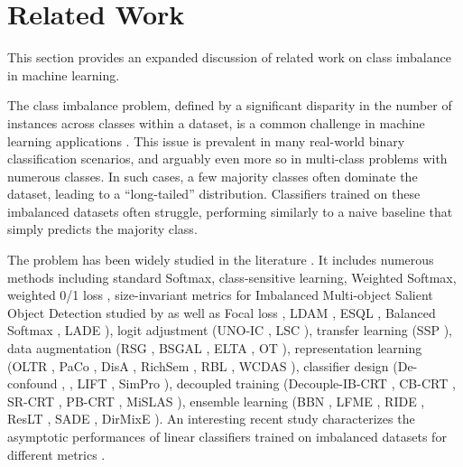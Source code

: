 \section{Related Work}
\label{app:related-work}

This section provides an expanded discussion of related work on class
imbalance in machine learning.

The class imbalance problem, defined by a significant disparity in the
number of instances across classes within a dataset, is a common
challenge in machine learning applications
\citep{Lewis:1994,Fawcett:1996,KubatMatwin1997,kang2021exploring,
  menon2020long, liu2019large,cui2019class}.  This issue is prevalent
in many real-world binary classification scenarios, and arguably even
more so in multi-class problems with numerous classes. In such cases,
a few majority classes often dominate the dataset, leading to a
``long-tailed'' distribution.  Classifiers trained on these imbalanced
datasets often struggle, performing similarly to a naive baseline that
simply predicts the majority class.

The problem has been widely studied in the literature
\citep{CardieNowe1997,KubatMatwin1997,chawla2002smote,he2009learning,
  WallaceSmallBrodleyTrikalinos2011}. It includes numerous methods
including standard Softmax, class-sensitive learning, {Weighted
  Softmax}, weighted 0/1 loss
\citep{GabidollaZharmagambetovCarreiraPerpinan2024}, size-invariant
metrics for Imbalanced Multi-object Salient Object Detection studied
by \citet{LiXuBaoYangCongCaoHuang2024} as well as {Focal loss}
\citep{lin2017focal}, {LDAM} \citep{cao2019learning}, {ESQL}
\citep{tan2020equalization}, {Balanced Softmax}
\citep{jiawei2020balanced}, {LADE} \citep{hong2020disentangling}),
logit adjustment ({UNO-IC} \citep{tian2020posterior}, {LSC} \citep{weilearning}), transfer
learning ({SSP} \citep{yang2020rethinking}), data augmentation ({RSG}
\citep{wang2021rsg}, {BSGAL} \citep{zhugenerative}, {ELTA} \citep{liuelta}, {OT} \citep{gao2024enhancing}), representation learning ({OLTR}
\citep{liu2019large}, {PaCo} \citep{cui2021parametric}, {DisA} \citep{gao2024distribution}, {RichSem} \citep{meng2024learning}, {RBL} \citep{meng2024learning}, {WCDAS} \citep{han2023wrapped}),  classifier
design ({De-confound} \citep{tang2020long}, \citep{yang2022inducing,kasarla2022maximum},  {LIFT} \citep{shi2024long}, {SimPro} \citep{dusimpro}), decoupled training
({Decouple-IB-CRT} \citep{kang2019decoupling}, {CB-CRT}
\citep{kang2019decoupling}, {SR-CRT} \citep{kang2019decoupling},
      {PB-CRT} \citep{kang2019decoupling}, {MiSLAS}
      \citep{zhong2021improving}), ensemble learning ({BBN}
      \citep{zhou2020bbn}, {LFME} \citep{xiang2020learning}, {RIDE}
      \citep{wang2020long}, {ResLT} \citep{cui2021reslt}, {SADE}
      \citep{zhang2021test}, {DirMixE} \citep{yangharnessing}).  An interesting recent study
      characterizes the asymptotic performances of linear classifiers
      trained on imbalanced datasets for different metrics
      \citep{LoffredoPastoreCoccoMonasson2024}.
      
